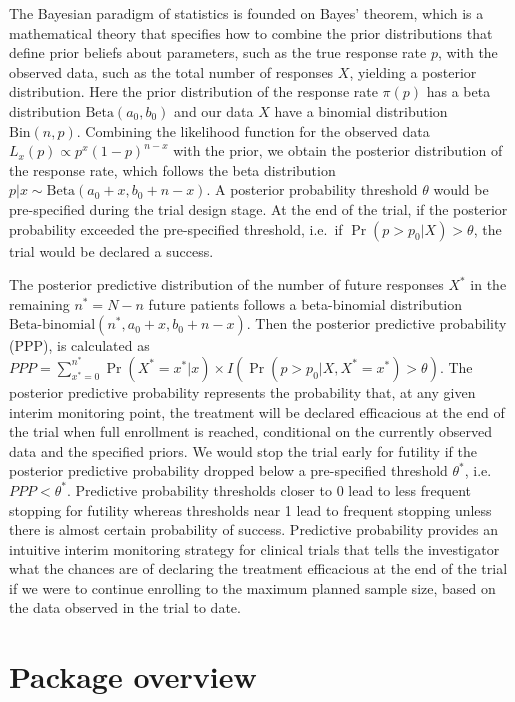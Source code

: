 The Bayesian paradigm of statistics is founded on Bayes' theorem, which
is a mathematical theory that specifies how to combine the prior
distributions that define prior beliefs about parameters, such as the
true response rate \(p\), with the observed data, such as the total
number of responses \(X\), yielding a posterior distribution. Here the
prior distribution of the response rate \(\pi(p)\) has a beta
distribution \(\mbox{Beta}(a_0, b_0)\) and our data \(X\) have a
binomial distribution \(\mbox{Bin}(n, p)\). Combining the likelihood
function for the observed data \(L_x(p) \propto p^x (1-p)^{n-x}\) with
the prior, we obtain the posterior distribution of the response rate,
which follows the beta distribution
\(p|x \sim \mbox{Beta}(a_0 + x, b_0 + n - x)\). A posterior probability
threshold \(\theta\) would be pre-specified during the trial design
stage. At the end of the trial, if the posterior probability exceeded
the pre-specified threshold, i.e.~if \(\Pr(p>p_0 | X) > \theta\), the
trial would be declared a success.

The posterior predictive distribution of the number of future responses
\(X^*\) in the remaining \(n^*=N-n\) future patients follows a
beta-binomial distribution
\(\mbox{Beta-binomial}(n^*, a_0 + x, b_0 + n - x)\). Then the posterior
predictive probability (PPP), is calculated as
\(PPP = \sum_{{x^*}=0}^{n^*} \Pr(X^*=x^*|x) \times I(\Pr(p>p_0 | X, X^*=x^*) > \theta)\).
The posterior predictive probability represents the probability that, at
any given interim monitoring point, the treatment will be declared
efficacious at the end of the trial when full enrollment is reached,
conditional on the currently observed data and the specified priors. We
would stop the trial early for futility if the posterior predictive
probability dropped below a pre-specified threshold \(\theta^*\),
i.e.~\(PPP<\theta^*\). Predictive probability thresholds closer to 0
lead to less frequent stopping for futility whereas thresholds near 1
lead to frequent stopping unless there is almost certain probability of
success. Predictive probability provides an intuitive interim monitoring
strategy for clinical trials that tells the investigator what the
chances are of declaring the treatment efficacious at the end of the
trial if we were to continue enrolling to the maximum planned sample
size, based on the data observed in the trial to date.

\hypertarget{package-overview}{%
\section{Package overview}\label{package-overview}}

